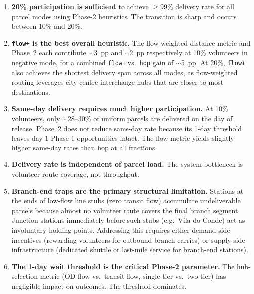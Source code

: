 \documentclass[11pt,a4paper]{article}
\begin{document}
\begin{enumerate}
  \item \textbf{20\% participation is sufficient} to achieve $\geq99\%$
        delivery rate for all parcel modes using Phase-2 heuristics. The
        transition is sharp and occurs between 10\% and 20\%.

  \item \textbf{\texttt{flow+} is the best overall heuristic.} The
        flow-weighted distance metric and Phase~2 each contribute $\sim$3~pp
        and $\sim$2~pp respectively at 10\% volunteers in negative mode,
        for a combined \texttt{flow+} vs.\ \texttt{hop} gain of $\sim$5~pp.
        At 20\%, \texttt{flow+} also achieves the shortest delivery span
        across all modes, as flow-weighted routing leverages city-centre
        interchange hubs that are closer to most destinations.

  \item \textbf{Same-day delivery requires much higher participation.}
        At 10\% volunteers, only $\sim$28--30\% of uniform parcels are
        delivered on the day of release. Phase~2 does not reduce same-day
        rate because its 1-day threshold leaves day-1 Phase-1 opportunities
        intact. The flow metric yields slightly higher same-day rates than
        hop at all fractions.

  \item \textbf{Delivery rate is independent of parcel load.}
        The system bottleneck is volunteer route coverage, not throughput.

  \item \textbf{Branch-end traps are the primary structural limitation.}
        Stations at the ends of low-flow line stubs (zero transit flow)
        accumulate undeliverable parcels because almost no volunteer route
        covers the final branch segment.  Junction stations immediately
        before such stubs (e.g.\ Vila do Conde) act as involuntary holding
        points.  Addressing this requires either demand-side incentives
        (rewarding volunteers for outbound branch carries) or supply-side
        infrastructure (dedicated shuttle or last-mile service for branch-end
        stations).

  \item \textbf{The 1-day wait threshold is the critical Phase-2 parameter.}
        The hub-selection metric (OD flow vs.\ transit flow, single-tier vs.\
        two-tier) has negligible impact on outcomes. The threshold dominates.
\end{enumerate}
\end{document}
